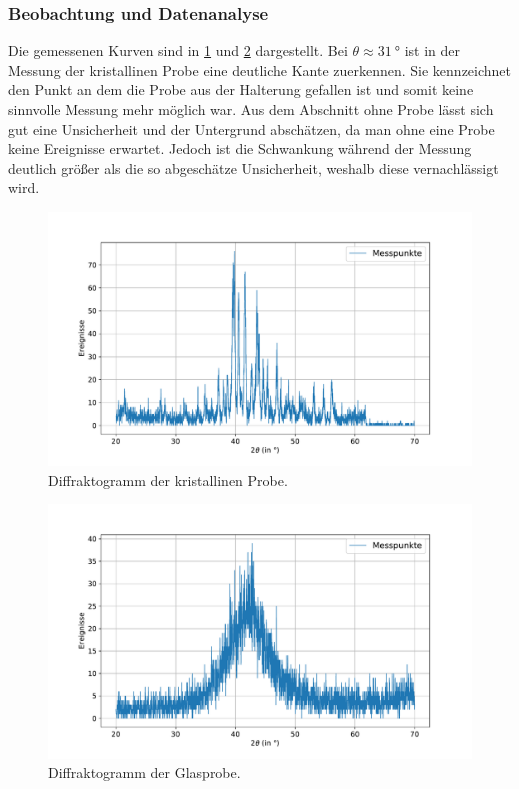 \documentclass[
	a4paper,
	12pt,
	pagesize,
	ngerman
]{scrartcl}
\begin{document}
	\subsubsection{Beobachtung und Datenanalyse}
	Die gemessenen Kurven sind in \cref{fig_xrd_kristallin} und \cref{fig_xrd_glas} dargestellt.
	Bei $\theta \approx \SI{31}{\degree}$ ist in der Messung der kristallinen Probe eine deutliche Kante zuerkennen.
	Sie kennzeichnet den Punkt an dem die Probe aus der Halterung gefallen ist und somit keine sinnvolle Messung mehr möglich war.
	Aus dem Abschnitt ohne Probe lässt sich gut eine Unsicherheit und der Untergrund abschätzen, da man ohne eine Probe keine Ereignisse erwartet. %
	Jedoch ist die Schwankung während der Messung deutlich größer als die so abgeschätze Unsicherheit, weshalb diese vernachlässigt wird.
	\begin{figure}[H]
			\includegraphics[width=\linewidth]{img/XRD_Kristallin_45_25.pdf}
			\caption{Diffraktogramm der kristallinen Probe.}
			\label{fig_xrd_kristallin}
	\end{figure}
	\begin{figure}[H]
			\includegraphics[width=\linewidth]{img/XRD_Glas_45_25.pdf}
			\caption{Diffraktogramm der Glasprobe.}
			\label{fig_xrd_glas}
	\end{figure}
\end{document}
